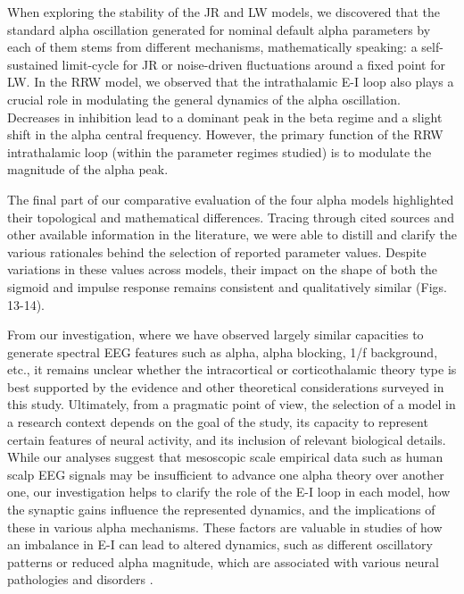 \documentclass[12pt,twoside]{article}
\begin{document}
When exploring the stability of the JR and LW models, we discovered that the standard alpha oscillation generated for nominal default alpha parameters by each of them stems from different mechanisms, mathematically speaking: a self-sustained limit-cycle for JR or noise-driven fluctuations around a fixed point for LW. In the RRW model, we observed that the intrathalamic E-I loop also plays a crucial role in modulating the general dynamics of the alpha oscillation. Decreases in inhibition lead to a dominant peak in the beta regime and a slight shift in the alpha central frequency. However, the primary function of the RRW intrathalamic loop (within the parameter regimes studied) is to modulate the magnitude of the alpha peak. 

The final part of our comparative evaluation of the four alpha models highlighted their topological and mathematical differences. Tracing through cited sources and other available information in the literature, we were able to distill and clarify the various rationales behind the selection of reported parameter values. Despite variations in these values across models, their impact on the shape of both the sigmoid and impulse response remains consistent and qualitatively similar (Figs. 13-14).

From our investigation, where we have observed largely similar capacities to generate spectral EEG features such as alpha, alpha blocking, 1/f background, etc., it remains unclear whether the intracortical or corticothalamic theory type is best supported by the evidence and other theoretical considerations surveyed in this study. Ultimately, from a pragmatic point of view, the selection of a model in a research context depends on the goal of the study, its capacity to represent certain features of neural activity, and its inclusion of relevant biological details. While our analyses suggest that mesoscopic scale empirical data such as human scalp EEG signals may be insufficient to advance one alpha theory over another one, our investigation helps to clarify the role of the E-I loop in each model, how the synaptic gains influence the represented dynamics, and the implications of these in various alpha mechanisms. These factors are valuable in studies of how an imbalance in E-I can lead to altered dynamics, such as different oscillatory patterns or reduced alpha magnitude, which are associated with various neural pathologies and disorders \citep{eichler2008ei, li2022excitation}. 
\end{document}
